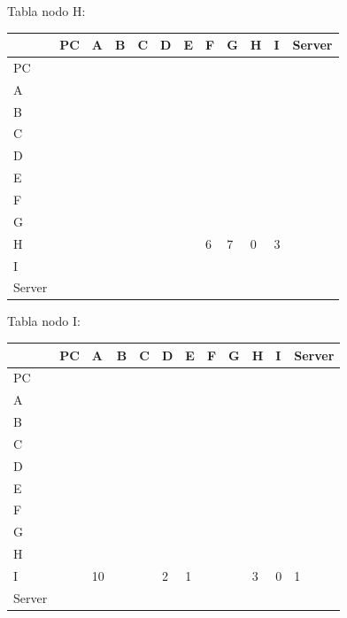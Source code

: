 \documentclass[a4paper]{article}
\begin{document}
\begin{table}[ht]
Tabla nodo H:\\
\begin{tabular}{|l|l|l|l|l|l|l|l|l|l|l|l|}
\hline
       & PC & A & B & C & D & E & F & G & H & I & Server \\ \hline
PC     &    &   &   &   &   &   &   &   &   &   &        \\ \hline
A      &    &   &   &   &   &   &   &   &   &   &        \\ \hline
B      &    &   &   &   &   &   &   &   &   &   &        \\ \hline
C      &    &   &   &   &   &   &   &   &   &   &        \\ \hline
D      &    &   &   &   &   &   &   &   &   &   &        \\ \hline
E      &    &   &   &   &   &   &   &   &   &   &        \\ \hline
F      &    &   &   &   &   &   &   &   &   &   &        \\ \hline
G      &    &   &   &   &   &   &   &   &   &   &        \\ \hline
H      &    &   &   &   &   &   & 6 & 7 & 0 & 3 &        \\ \hline
I      &    &   &   &   &   &   &   &   &   &   &        \\ \hline
Server &    &   &   &   &   &   &   &   &   &   &        \\ \hline
\end{tabular}
\end{table}


\begin{table}[ht]
Tabla nodo I:\\
\begin{tabular}{|l|l|l|l|l|l|l|l|l|l|l|l|}
\hline
       & PC & A  & B & C & D & E & F & G & H & I & Server \\ \hline
PC     &    &    &   &   &   &   &   &   &   &   &        \\ \hline
A      &    &    &   &   &   &   &   &   &   &   &        \\ \hline
B      &    &    &   &   &   &   &   &   &   &   &        \\ \hline
C      &    &    &   &   &   &   &   &   &   &   &        \\ \hline
D      &    &    &   &   &   &   &   &   &   &   &        \\ \hline
E      &    &    &   &   &   &   &   &   &   &   &        \\ \hline
F      &    &    &   &   &   &   &   &   &   &   &        \\ \hline
G      &    &    &   &   &   &   &   &   &   &   &        \\ \hline
H      &    &    &   &   &   &   &   &   &   &   &        \\ \hline
I      &    & 10 &   &   & 2 & 1 &   &   & 3 & 0 & 1       \\ \hline
Server &    &    &   &   &   &   &   &   &   &   &        \\ \hline
\end{tabular}
\end{table}
\end{document}
